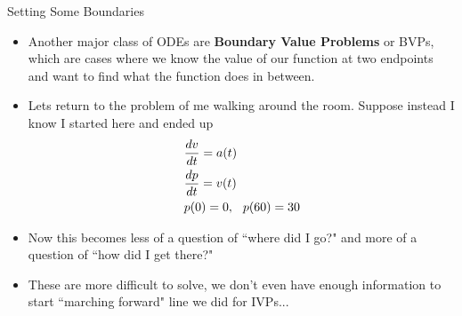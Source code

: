 {}\documentclass[letterpaper,
compress,
xcolor=x11names,
]{beamer}
\begin{document}
\begin{frame}{Setting Some Boundaries}
	\footnotesize
	\begin{itemize}
		\item Another major class of ODEs are \textbf{Boundary Value Problems} or BVPs, which are cases where we know the value of our function at two endpoints and want to find what the function does in between.
		\item<2-> Lets return to the problem of me walking around the room. Suppose instead I know I started here and ended up 
		\begin{align*}
			&\frac{dv}{dt} = a(t) \\
			&\frac{dp}{dt} = v(t) \\
			&p(0) = 0,\hspace{0.25cm} p(60) = 30
		\end{align*}
		\item<3-> Now this becomes less of a question of ``where did I go?" and more of a question of ``how did I get there?"
		\item<4-> These are more difficult to solve, we don't even have enough information to start ``marching forward" line we did for IVPs...
	\end{itemize}
\end{frame}

\end{document}
